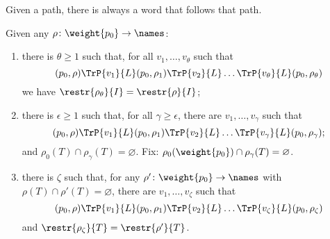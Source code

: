 \begin{lemma}
Given a path, there is always a word that follows that path.
\end{lemma}

\begin{lemma} Given any $\rho \colon \weight{p_0} \to \names$:
\label{lem:IT}
\begin{enumerate}

\item
there is $\theta \geq 1$ such that, for all $v_1,\dots,v_\theta$ such that
\[
	(p_0,\rho) \TrP{v_1}{L} (p_0,\rho_1) \TrP{v_2}{L} \dots \TrP{v_{\theta}}{L} (p_0,\rho_\theta)
\]
we have $\restr{ \rho_\theta }{I} = \restr{ \rho }{I}$;
\label{idI}

\item there is $\epsilon \geq 1$ such that, for all $\gamma \geq \epsilon$, there are $v_1,\dots,v_\gamma$ such that
\[
	(p_0,\rho) \TrP{v_1}{L} (p_0,\rho_1) \TrP{v_2}{L} \dots \TrP{v_\gamma}{L} (p_0,\rho_\gamma);
\]
and $\rho_0(T) \cap \rho_\gamma(T) = \varnothing$.
Fix: $\rho_0(\weight{p_0}) \cap \rho_\gamma(T) = \varnothing$.
\label{forgetT}
\item
there is $\zeta$ such that, for any $\rho' \colon \weight{p_0} \to \names$ with $\rho(T) \cap \rho'(T) = \varnothing$, there are $v_1,\dots,v_\zeta$ such that
\[
	(p_0,\rho) \TrP{v_1}{L} (p_0,\rho_1) \TrP{v_2}{L} \dots \TrP{v_\zeta}{L} (p_0,\rho_\zeta)	
\]
and $\restr{\rho_\zeta}{T} = \restr{\rho'}{T}$.
\label{initT}
\end{enumerate}
\end{lemma}
